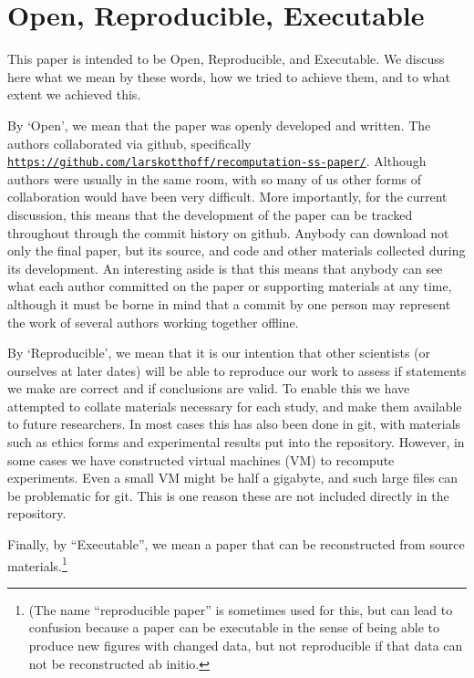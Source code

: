\section{Open, Reproducible, Executable}

This paper is intended to be Open, Reproducible, and Executable.  We discuss here what we mean by these words, how we tried to achieve them, and to what extent we achieved this.

By `Open', we mean that the paper was openly developed and written.  The authors collaborated via github, specifically
\texttt{\url{https://github.com/larskotthoff/recomputation-ss-paper/}}.   Although authors were usually in the same room, with so many of us other forms of collaboration would have been very 
difficult.  More importantly, for the current discussion, this means that the development of the paper can be tracked throughout through the commit history on github.  Anybody can download not only the final paper, but its source, and code and other materials collected during its development.  An interesting aside is that this means that anybody can see what each author committed on the paper or supporting materials at any time, although it must be borne in mind that a commit by one person may represent the work of several authors working together offline.

By `Reproducible', we mean that it is our intention that other scientists (or ourselves at later dates) will be able to reproduce our work to assess if statements we make are correct and if conclusions are valid.  To enable this we have attempted to collate materials necessary for each study, and make them available to future researchers.  In most cases this has also been done in git, 
with materials such as ethics forms and experimental results put into the repository.  However, in some cases we have constructed virtual machines (VM) to recompute experiments.  Even a small VM 
might be half a gigabyte, and such large files can be problematic for git.  This is one reason these are not included directly in the repository.

Finally, by ``Executable'', we mean a paper that can be reconstructed from source 
materials.\footnote{(The name ``reproducible paper'' is sometimes used for this, but can lead to confusion because a paper can be executable in the sense of being able to produce new figures with 
changed data, but not reproducible if that data can not be reconstructed ab initio.}



